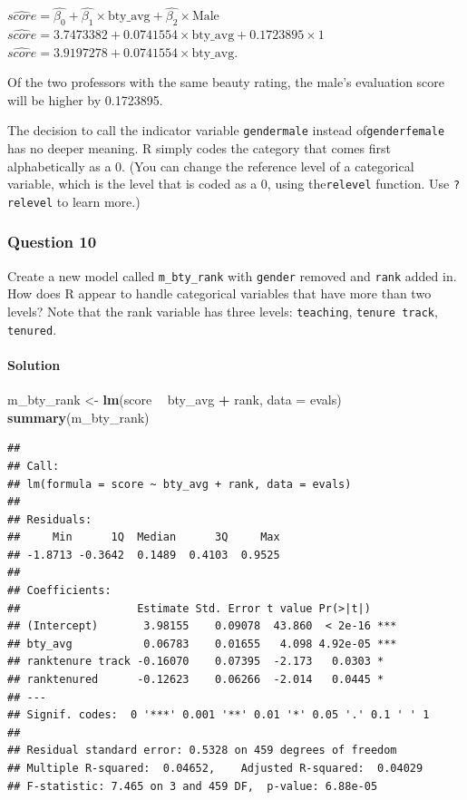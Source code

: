 \documentclass[]{article}
\newenvironment{Shaded}{\begin{snugshade}}{\end{snugshade}}
\newcommand{\KeywordTok}[1]{\textcolor[rgb]{0.13,0.29,0.53}{\textbf{#1}}}
\newcommand{\DataTypeTok}[1]{\textcolor[rgb]{0.13,0.29,0.53}{#1}}
\newcommand{\StringTok}[1]{\textcolor[rgb]{0.31,0.60,0.02}{#1}}
\newcommand{\OperatorTok}[1]{\textcolor[rgb]{0.81,0.36,0.00}{\textbf{#1}}}
\newcommand{\NormalTok}[1]{#1}
\let\oldparagraph\paragraph
\renewcommand{\paragraph}[1]{\oldparagraph{#1}\mbox{}}
\begin{document}
\(\widehat{score} = \hat{\beta_0} + \hat{\beta_1} \times \text{bty_avg} + \hat{\beta_2} \times \text{Male}\)
\(\widehat{score} = 3.7473382 + 0.0741554 \times \text{bty_avg} + 0.1723895 \times 1\)
\(\widehat{score} = 3.9197278 + 0.0741554 \times \text{bty_avg}\).

Of the two professors with the same beauty rating, the male's evaluation
score will be higher by 0.1723895.

The decision to call the indicator variable \texttt{gendermale} instead
of\texttt{genderfemale} has no deeper meaning. R simply codes the
category that comes first alphabetically as a \(0\). (You can change the
reference level of a categorical variable, which is the level that is
coded as a 0, using the\texttt{relevel} function. Use \texttt{?relevel}
to learn more.)

\subsubsection{Question 10}\label{question-10}

Create a new model called \texttt{m\_bty\_rank} with \texttt{gender}
removed and \texttt{rank} added in. How does R appear to handle
categorical variables that have more than two levels? Note that the rank
variable has three levels: \texttt{teaching}, \texttt{tenure\ track},
\texttt{tenured}.

\paragraph{Solution}\label{solution-9}

\begin{Shaded}
\begin{Highlighting}[]
\NormalTok{m_bty_rank <-}\StringTok{ }\KeywordTok{lm}\NormalTok{(score }\OperatorTok{~}\StringTok{ }\NormalTok{bty_avg }\OperatorTok{+}\StringTok{ }\NormalTok{rank, }\DataTypeTok{data =}\NormalTok{ evals)}
\KeywordTok{summary}\NormalTok{(m_bty_rank)}
\end{Highlighting}
\end{Shaded}

\begin{verbatim}
## 
## Call:
## lm(formula = score ~ bty_avg + rank, data = evals)
## 
## Residuals:
##     Min      1Q  Median      3Q     Max 
## -1.8713 -0.3642  0.1489  0.4103  0.9525 
## 
## Coefficients:
##                  Estimate Std. Error t value Pr(>|t|)    
## (Intercept)       3.98155    0.09078  43.860  < 2e-16 ***
## bty_avg           0.06783    0.01655   4.098 4.92e-05 ***
## ranktenure track -0.16070    0.07395  -2.173   0.0303 *  
## ranktenured      -0.12623    0.06266  -2.014   0.0445 *  
## ---
## Signif. codes:  0 '***' 0.001 '**' 0.01 '*' 0.05 '.' 0.1 ' ' 1
## 
## Residual standard error: 0.5328 on 459 degrees of freedom
## Multiple R-squared:  0.04652,    Adjusted R-squared:  0.04029 
## F-statistic: 7.465 on 3 and 459 DF,  p-value: 6.88e-05
\end{verbatim}
\end{document}
